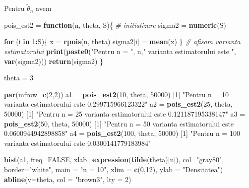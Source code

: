 \documentclass[
]{article}
\newenvironment{Shaded}{\begin{snugshade}}{\end{snugshade}}
\newcommand{\CommentTok}[1]{\textcolor[rgb]{0.56,0.35,0.01}{\textit{#1}}}
\newcommand{\ControlFlowTok}[1]{\textcolor[rgb]{0.13,0.29,0.53}{\textbf{#1}}}
\newcommand{\DataTypeTok}[1]{\textcolor[rgb]{0.13,0.29,0.53}{#1}}
\newcommand{\DecValTok}[1]{\textcolor[rgb]{0.00,0.00,0.81}{#1}}
\newcommand{\KeywordTok}[1]{\textcolor[rgb]{0.13,0.29,0.53}{\textbf{#1}}}
\newcommand{\NormalTok}[1]{#1}
\newcommand{\OperatorTok}[1]{\textcolor[rgb]{0.81,0.36,0.00}{\textbf{#1}}}
\newcommand{\OtherTok}[1]{\textcolor[rgb]{0.56,0.35,0.01}{#1}}
\newcommand{\StringTok}[1]{\textcolor[rgb]{0.31,0.60,0.02}{#1}}
\begin{document}
Pentru \(\tilde{\theta}_n\) avem

\begin{Shaded}
\begin{Highlighting}[]
\NormalTok{pois_est2 =}\StringTok{ }\ControlFlowTok{function}\NormalTok{(n, theta, S)\{}
  \CommentTok{# initializare}
\NormalTok{  sigma2 =}\StringTok{ }\KeywordTok{numeric}\NormalTok{(S)}
  
  \ControlFlowTok{for}\NormalTok{ (i }\ControlFlowTok{in} \DecValTok{1}\OperatorTok{:}\NormalTok{S)\{}
\NormalTok{    x =}\StringTok{ }\KeywordTok{rpois}\NormalTok{(n, theta)}
\NormalTok{    sigma2[i] =}\StringTok{ }\KeywordTok{mean}\NormalTok{(x)}
\NormalTok{  \}}
  \CommentTok{# afisam varianta estimatorului}
  \KeywordTok{print}\NormalTok{(}\KeywordTok{paste0}\NormalTok{(}\StringTok{"Pentru n = "}\NormalTok{, n,}\StringTok{" varianta estimatorului este "}\NormalTok{, }\KeywordTok{var}\NormalTok{(sigma2)))}
  \KeywordTok{return}\NormalTok{(sigma2)}
\NormalTok{\}}

\NormalTok{theta =}\StringTok{ }\DecValTok{3}

\KeywordTok{par}\NormalTok{(}\DataTypeTok{mfrow=}\KeywordTok{c}\NormalTok{(}\DecValTok{2}\NormalTok{,}\DecValTok{2}\NormalTok{))}
\NormalTok{a1 =}\StringTok{ }\KeywordTok{pois_est2}\NormalTok{(}\DecValTok{10}\NormalTok{, theta, }\DecValTok{50000}\NormalTok{)}
\NormalTok{[}\DecValTok{1}\NormalTok{] }\StringTok{"Pentru n = 10 varianta estimatorului este 0.299715966123322"}
\NormalTok{a2 =}\StringTok{ }\KeywordTok{pois_est2}\NormalTok{(}\DecValTok{25}\NormalTok{, theta, }\DecValTok{50000}\NormalTok{)}
\NormalTok{[}\DecValTok{1}\NormalTok{] }\StringTok{"Pentru n = 25 varianta estimatorului este 0.121187195338147"}
\NormalTok{a3 =}\StringTok{ }\KeywordTok{pois_est2}\NormalTok{(}\DecValTok{50}\NormalTok{, theta, }\DecValTok{50000}\NormalTok{)}
\NormalTok{[}\DecValTok{1}\NormalTok{] }\StringTok{"Pentru n = 50 varianta estimatorului este 0.0600944942898858"}
\NormalTok{a4 =}\StringTok{ }\KeywordTok{pois_est2}\NormalTok{(}\DecValTok{100}\NormalTok{, theta, }\DecValTok{50000}\NormalTok{)}
\NormalTok{[}\DecValTok{1}\NormalTok{] }\StringTok{"Pentru n = 100 varianta estimatorului este 0.0300141779183984"}


\KeywordTok{hist}\NormalTok{(a1, }\DataTypeTok{freq=}\OtherTok{FALSE}\NormalTok{, }\DataTypeTok{xlab=}\KeywordTok{expression}\NormalTok{(}\KeywordTok{tilde}\NormalTok{(theta)[n]), }
     \DataTypeTok{col=}\StringTok{"gray80"}\NormalTok{, }\DataTypeTok{border=}\StringTok{"white"}\NormalTok{, }\DataTypeTok{main =} \StringTok{"n = 10"}\NormalTok{, }\DataTypeTok{xlim =} \KeywordTok{c}\NormalTok{(}\DecValTok{0}\NormalTok{,}\DecValTok{12}\NormalTok{),}
     \DataTypeTok{ylab =} \StringTok{"Densitatea"}\NormalTok{)}
\KeywordTok{abline}\NormalTok{(}\DataTypeTok{v=}\NormalTok{theta, }\DataTypeTok{col =} \StringTok{"brown3"}\NormalTok{, }\DataTypeTok{lty =} \DecValTok{2}\NormalTok{)}


\end{Highlighting}
\end{Shaded}
\end{document}
